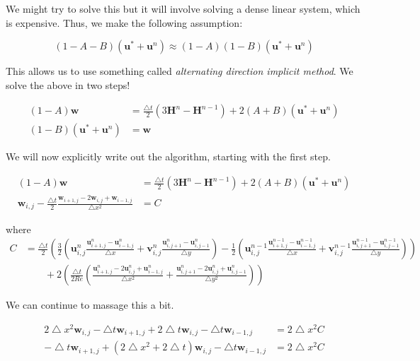 \documentclass[12pt]{article}
\begin{document}
We might try to solve this but it will involve solving a dense linear system, which is expensive. Thus, we make the following assumption:

\begin{equation}
(1 - A - B)(\mathbf{u}^* + \mathbf{u}^n) \approx (1 - A)(1 - B)(\mathbf{u}^* + \mathbf{u}^n)
\end{equation}

This allows us to use something called \textit{alternating direction implicit method}. We solve the above in two steps!

\begin{align}
(1 - A)\mathbf{w} &= \frac{\bigtriangleup t}{2}(3\mathbf{H}^n - \mathbf{H}^{n-1}) + 2(A + B)(\mathbf{u}^* + \mathbf{u}^n) \\
(1 - B)(\mathbf{u}^* + \mathbf{u}^n) &= \mathbf{w}
\end{align}

We will now explicitly write out the algorithm, starting with the first step.

\begin{align*}
    (1 - A)\mathbf{w} &= \frac{\bigtriangleup t}{2}(3\mathbf{H}^n - \mathbf{H}^{n-1}) + 2(A + B)(\mathbf{u}^* + \mathbf{u}^n) \\
    \mathbf{w}_{i,j} - \frac{\bigtriangleup t}{2} \frac{\mathbf{w}_{i+1,j} - 2\mathbf{w}_{i,j} + \mathbf{w}_{i-1,j}}{\bigtriangleup x^2} &= C
\end{align*}

where
\begin{align*}
    C &= \frac{\bigtriangleup t}{2}(\frac{3}{2}(\mathbf{u}^n_{i,j}\frac{\mathbf{u}^n_{i+1,j} - \mathbf{u}^n_{i-1,j}}{\bigtriangleup x} + \mathbf{v}^n_{i,j}\frac{\mathbf{u}^n_{i,j+1} - \mathbf{u}^n_{i,j-1}}{\bigtriangleup y}) - \frac{1}{2}(\mathbf{u}^{n-1}_{i,j}\frac{\mathbf{u}^{n-1}_{i+1,j} - \mathbf{u}^{n-1}_{i-1,j}}{\bigtriangleup x} + \mathbf{v}^{n-1}_{i,j}\frac{\mathbf{u}^{n-1}_{i,j+1} - \mathbf{u}^{n-1}_{i,j-1}}{\bigtriangleup y})) \\
    & \qquad + 2(\frac{\bigtriangleup t}{2 Re}(\frac{\mathbf{u}^n_{i+1,j} -2\mathbf{u}^n_{i,j} + \mathbf{u}^n_{i-1,j}}{\bigtriangleup x^2} + \frac{\mathbf{u}^n_{i,j+1} -2\mathbf{u}^n_{i,j} + \mathbf{u}^n_{i,j-1}}{\bigtriangleup y^2}))
\end{align*}

We can continue to massage this a bit.

\begin{align*}
    2\bigtriangleup x^2 \mathbf{w}_{i,j} - \bigtriangleup t \mathbf{w}_{i+1,j} + 2\bigtriangleup t \mathbf{w}_{i,j} - \bigtriangleup t \mathbf{w}_{i-1,j} &= 2\bigtriangleup x^2 C \\
    - \bigtriangleup t\mathbf{w}_{i+1,j} + (2\bigtriangleup x^2 + 2\bigtriangleup t)\mathbf{w}_{i,j} - \bigtriangleup t \mathbf{w}_{i-1,j} &= 2\bigtriangleup x^2 C
\end{align*}
\end{document}
